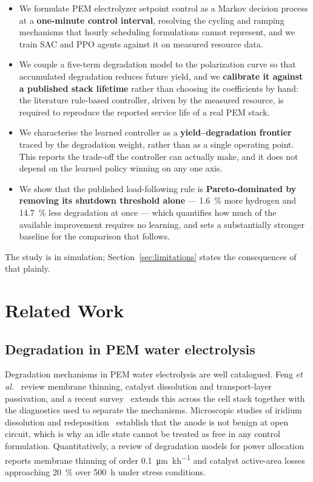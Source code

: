 \documentclass[conference]{IEEEtran}
\begin{document}
\begin{itemize}
  \item We formulate PEM electrolyzer setpoint control as a Markov decision process at a
        \textbf{one-minute control interval}, resolving the cycling and ramping mechanisms
        that hourly scheduling formulations cannot represent, and we train SAC and PPO
        agents against it on measured resource data.
  \item We couple a five-term degradation model to the polarization curve so that
        accumulated degradation reduces future yield, and we \textbf{calibrate it against a
        published stack lifetime} rather than choosing its coefficients by hand: the
        literature rule-based controller, driven by the measured resource, is required to
        reproduce the reported service life of a real PEM stack.
  \item We characterise the learned controller as a \textbf{yield--degradation frontier}
        traced by the degradation weight, rather than as a single operating point. This
        reports the trade-off the controller can actually make, and it does not depend on
        the learned policy winning on any one axis.
  \item We show that the published load-following rule is \textbf{Pareto-dominated by
        removing its shutdown threshold alone} --- \SI{1.6}{\percent} more hydrogen and
        \SI{14.7}{\percent} less degradation at once --- which quantifies how much of the
        available improvement requires no learning, and sets a substantially stronger
        baseline for the comparison that follows.
\end{itemize}

The study is in simulation; Section~\ref{sec:limitations} states the consequences of that
plainly.

\section{Related Work}\label{sec:related}

\subsection{Degradation in PEM water electrolysis}
Degradation mechanisms in PEM water electrolysis are well catalogued. Feng
\emph{et al.}~\cite{feng2017pemwe} review membrane thinning, catalyst dissolution and
transport-layer passivation, and a recent survey~\cite{bernhardt2026degradation} extends
this across the cell stack together with the diagnostics used to separate the mechanisms.
Microscopic studies of iridium dissolution and redeposition~\cite{yu2020iridium} establish
that the anode is not benign at open circuit, which is why an idle state cannot be treated
as free in any control formulation. Quantitatively, a review of degradation models for
power allocation~\cite{degmodels2025} reports membrane thinning of order
\SI{0.1}{\micro\meter\per\kilo\hour} and catalyst active-area losses approaching
\SI{20}{\percent} over \SI{500}{\hour} under stress conditions.
\end{document}
